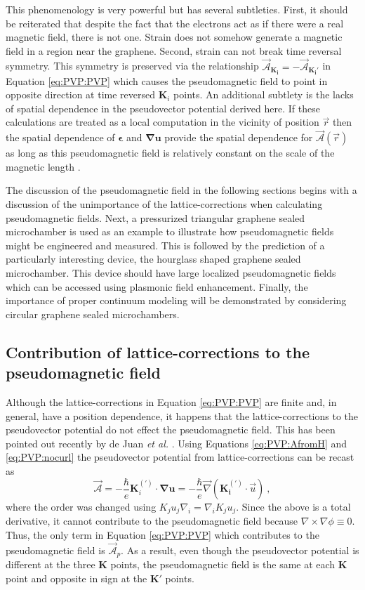 This phenomenology is very powerful but has several subtleties.
First, it should be reiterated that despite the fact that the electrons act as if there were a real magnetic field, there is not one.
Strain does not somehow generate a magnetic field in a region near the graphene.
Second, strain can not break time reversal symmetry.
This symmetry is preserved via the relationship $\vec{\mathcal{A}}_{\bm{K_i}} = - \vec{\mathcal{A}}_{\bm{K_i'}}$ in Equation \ref{eq:PVP:PVP} which causes the pseudomagnetic field to point in opposite direction at time reversed $\bm{K}_i$ points.
An additional subtlety is the lacks of spatial dependence in the pseudovector potential derived here.
If these calculations are treated as a local computation in the vicinity of position $\vec{r}$ then the spatial dependence of $\bm{\epsilon}$ and $\bm{\nabla u}$ provide the spatial dependence for $\vec{\mathcal{A}}(\vec{r})$ as long as this pseudomagnetic field is relatively constant on the scale of the magnetic length \cite{CastroNeto2009}.

The discussion of the pseudomagnetic field in the following sections begins with a discussion of the unimportance of the lattice-corrections when calculating pseudomagnetic fields.
Next, a pressurized triangular graphene sealed microchamber \cite{Guinea2009} is used as an example to illustrate how pseudomagnetic fields might be engineered and measured.
This is followed by the prediction of a particularly interesting device, the hourglass shaped graphene sealed microchamber.
This device should have large localized pseudomagnetic fields which can be accessed using plasmonic field enhancement.
Finally, the importance of proper continuum modeling will be demonstrated by considering circular graphene sealed microchambers.

\subsection{Contribution of lattice-corrections to the pseudomagnetic field}
Although the lattice-corrections in Equation \ref{eq:PVP:PVP} are finite and, in general, have a position dependence, it happens that the lattice-corrections to the pseudovector potential do not effect the pseudomagnetic field.
This has been pointed out recently by de Juan \textit{et al.} \cite{DeJuan2013}. 
Using Equations \ref{eq:PVP:AfromH} and \ref{eq:PVP:nocurl} the pseudovector potential from lattice-corrections can be recast as 
\begin{equation*}
  \vec{\mathcal{A}}=-\frac{\hbar}{e} \bm{K}_i^{(')} \cdot \bm{\nabla u} 
  = - \frac{\hbar}{e} \vec{\nabla} \left( \bm{K_i^{(')}} \cdot \vec{u} \right) \ ,
\end{equation*}
where the order was changed using $K_j u_j \nabla_i=\nabla_i K_j u_j$.
Since the above is a total derivative, it cannot contribute to the pseudomagnetic field because $\nabla\times\nabla \phi \equiv 0$.
Thus, the only term in Equation \ref{eq:PVP:PVP} which contributes to the pseudomagnetic field is $\vec{\mathcal{A}}_p$.
As a result, even though the pseudovector potential is different at the three $\bm{K}$ points, the pseudomagnetic field is the same at each $\bm{K}$ point and opposite in sign at the $\bm{K}'$ points.

